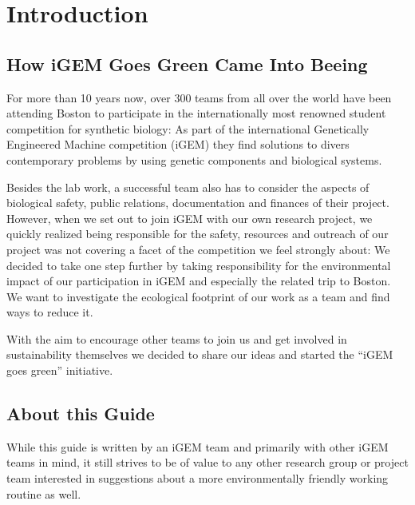 
\chapter*{Introduction}
\section*{How iGEM Goes Green Came Into Beeing}
For more than 10 years now, over 300 teams from all over the world have been attending Boston to participate in the internationally most renowned student competition for synthetic biology: As part of the international Genetically Engineered Machine competition (iGEM) they find solutions to divers contemporary problems by using genetic components and biological systems.

Besides the lab work, a successful team also has to consider the aspects of biological safety, public relations, documentation and finances of their project. However, when we set out to join iGEM with our own research project, we quickly realized being responsible for the safety, resources and outreach of our project was not covering a facet of the competition we feel strongly about: We decided to take one step further by taking responsibility for the environmental impact of our participation in iGEM and especially the related trip to Boston. We want to investigate the ecological footprint of our work as a team and find ways to reduce it. 

With the aim to encourage other teams to join us and get involved in sustainability themselves we decided to share our ideas and started the “iGEM goes green” initiative.

\section*{About this Guide}
While this guide is written by an iGEM team and primarily with other iGEM teams in mind, it still strives to be of value to any other research group or project team interested in suggestions about a more environmentally friendly working routine as well.

